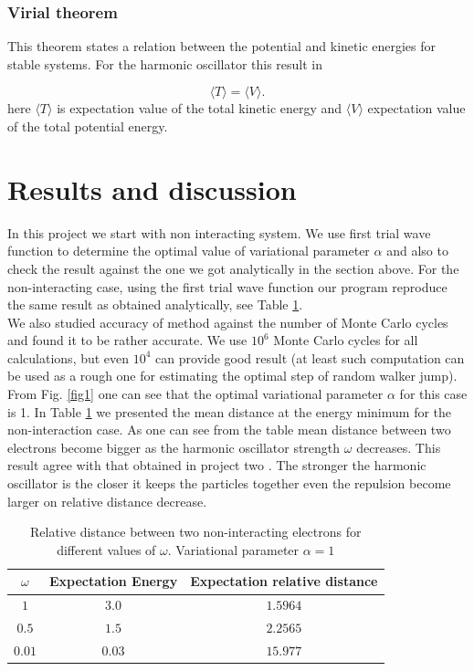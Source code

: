 \documentclass[10pt]{article}
\begin{document}
\subsubsection{Virial theorem}
This theorem states a relation between the potential and kinetic energies for stable systems. For the harmonic oscillator this result in 

\begin{equation*}
  \langle T \rangle= \langle V \rangle.
  \end{equation*}
here $\langle T \rangle$ is expectation value of the total kinetic energy and   $\langle V \rangle$ expectation value of the total potential energy.

\newpage
\section{Results and discussion}\label{results}

In this project we start with non interacting system. We use first trial wave function to determine the optimal value of variational parameter $\alpha$ and also to check the result against the one we got analytically in the section above. For the non-interacting case, using the first trial wave function our program reproduce the same result as obtained analytically, see Table \ref{tab:one}. \\
We also studied accuracy of method against the number of Monte Carlo cycles and found it to be rather accurate. We use $10^6$ Monte Carlo cycles for all calculations, but even $10^4$ can provide good result (at least such computation can be used as a rough one for estimating the optimal step of random walker jump). 
From Fig. \ref{fig1} one can see that the optimal variational parameter $\alpha$ for this case is 1. In Table \ref{tab:one} we presented the mean distance at the energy minimum for the non-interaction case. As one can see from the table mean distance between two electrons become bigger as the harmonic oscillator strength $\omega$ decreases. This result agree with that obtained in project two \cite{proj2}. The stronger the harmonic oscillator is the closer it keeps the particles together even the repulsion become larger on relative distance decrease. 

\begin{table}[h!]
  \caption{Relative distance between two non-interacting electrons for different values of $\omega$. Variational parameter $\alpha =1$}
  \label{tab:one}
  \begin{center}
    \begin{tabular}{c|c|c}
    \hline
		$\omega$& Expectation Energy & Expectation relative distance \\
    \hline
	$	1 $  &  $3.0$ & $1.5964$  \\
	$	0.5$   &$1.5$ & $2.2565$   \\
	$	0.01$   & $0.03$ &  $15.977$   \\
	\end{tabular}
  \end{center}
\end{table}
\end{document}
